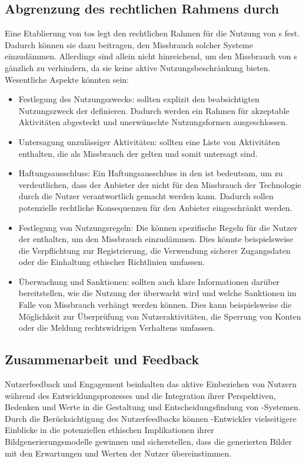 \documentclass[12pt]{report}
\begin{document}
\subsection{Abgrenzung des rechtlichen Rahmens durch {}}
Eine Etablierung von \Gls{tos} legt den rechtlichen Rahmen für die Nutzung von s fest. Dadurch können sie dazu beitragen, den Missbrauch solcher Systeme einzudämmen. 
Allerdings sind  allein nicht hinreichend, um den Missbrauch von s gänzlich zu verhindern, da sie keine aktive Nutzungsbeschränkung bieten. Wesentliche Aspekte könnten sein:
\begin{itemize}
    \item Festlegung des Nutzungszwecks:  sollten explizit den beabsichtigten Nutzungszweck der  definieren. Dadurch werden ein Rahmen für akzeptable Aktivitäten abgesteckt und unerwünschte Nutzungsformen ausgeschlossen.
    \item Untersagung unzulässiger Aktivitäten:  sollten eine Liste von Aktivitäten enthalten, die als Missbrauch der  gelten und somit untersagt sind.
    \item Haftungsausschluss: Ein Haftungsausschluss in den  ist bedeutsam, um zu verdeutlichen, dass der Anbieter der  nicht für den Missbrauch der Technologie durch die Nutzer verantwortlich gemacht werden kann. Dadurch sollen potenzielle rechtliche Konsequenzen für den Anbieter eingeschränkt werden.
    \item Festlegung von Nutzungsregeln: Die   können spezifische Regeln für die Nutzer der  enthalten, um den Missbrauch einzudämmen. Dies könnte beispielsweise die Verpflichtung zur Registrierung, die Verwendung sicherer Zugangsdaten oder die Einhaltung ethischer Richtlinien umfassen.
    \item Überwachung und Sanktionen:  sollten auch klare Informationen darüber bereitstellen, wie die Nutzung der  überwacht wird und welche Sanktionen im Falle von Missbrauch verhängt werden können. Dies kann beispielsweise die Möglichkeit zur Überprüfung von Nutzeraktivitäten, die Sperrung von Konten oder die Meldung rechtswidrigen Verhaltens umfassen.
\end{itemize}

\subsection{Zusammenarbeit und Feedback}
Nutzerfeedback und Engagement beinhalten das aktive Einbeziehen von Nutzern während des Entwicklungsprozesses und die Integration ihrer Perspektiven, Bedenken und Werte in die Gestaltung und Entscheidungsfindung von -Systemen. Durch die Berücksichtigung des Nutzerfeedbacks können -Entwickler vielseitigere Einblicke in die potenziellen ethischen Implikationen ihrer Bildgenerierungsmodelle gewinnen und sicherstellen, dass die generierten Bilder mit den Erwartungen und Werten der Nutzer übereinstimmen.
\end{document}
